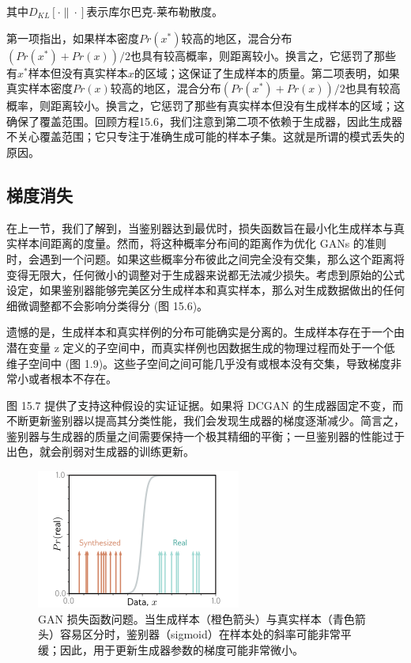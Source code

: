 其中\(D_{KL}[\cdot\|\cdot]\)表示库尔巴克-莱布勒散度。

第一项指出，如果样本密度\(Pr(x^*)\)较高的地区，混合分布\((Pr(x^*) + Pr(x))/2\)也具有较高概率，则距离较小。换言之，它惩罚了那些有\(x^*\)样本但没有真实样本\(x\)的区域；这保证了生成样本的质量。第二项表明，如果真实样本密度\(Pr(x)\)较高的地区，混合分布\((Pr(x^*) + Pr(x))/2\)也具有较高概率，则距离较小。换言之，它惩罚了那些有真实样本但没有生成样本的区域；这确保了覆盖范围。回顾方程15.6，我们注意到第二项不依赖于生成器，因此生成器不关心覆盖范围；它只专注于准确生成可能的样本子集。这就是所谓的模式丢失的原因。

\subsection{梯度消失}
在上一节，我们了解到，当鉴别器达到最优时，损失函数旨在最小化生成样本与真实样本间距离的度量。然而，将这种概率分布间的距离作为优化 GANs 的准则时，会遇到一个问题。如果这些概率分布彼此之间完全没有交集，那么这个距离将变得无限大，任何微小的调整对于生成器来说都无法减少损失。考虑到原始的公式设定，如果鉴别器能够完美区分生成样本和真实样本，那么对生成数据做出的任何细微调整都不会影响分类得分 (图 15.6)。

遗憾的是，生成样本和真实样例的分布可能确实是分离的。生成样本存在于一个由潜在变量 z 定义的子空间中，而真实样例也因数据生成的物理过程而处于一个低维子空间中 (图 1.9)。这些子空间之间可能几乎没有或根本没有交集，导致梯度非常小或者根本不存在。

图 15.7 提供了支持这种假设的实证证据。如果将 DCGAN 的生成器固定不变，而不断更新鉴别器以提高其分类性能，我们会发现生成器的梯度逐渐减少。简言之，鉴别器与生成器的质量之间需要保持一个极其精细的平衡；一旦鉴别器的性能过于出色，就会削弱对生成器的训练更新。

\begin{figure}[ht!]
\centering
\includegraphics[width=0.7\linewidth]{png/chapter15/GanGaussMotivationProb.png}
\caption{GAN 损失函数问题。当生成样本（橙色箭头）与真实样本（青色箭头）容易区分时，鉴别器（sigmoid）在样本处的斜率可能非常平缓；因此，用于更新生成器参数的梯度可能非常微小。}
\end{figure}


